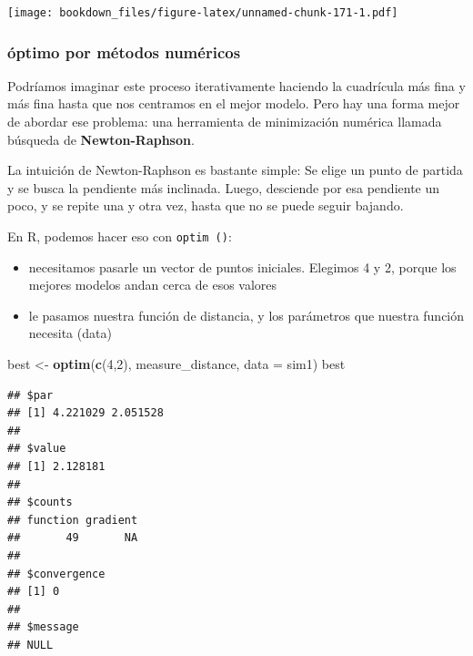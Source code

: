 \documentclass[]{book}
\newenvironment{Shaded}{\begin{snugshade}}{\end{snugshade}}
\newcommand{\DataTypeTok}[1]{\textcolor[rgb]{0.13,0.29,0.53}{#1}}
\newcommand{\DecValTok}[1]{\textcolor[rgb]{0.00,0.00,0.81}{#1}}
\newcommand{\KeywordTok}[1]{\textcolor[rgb]{0.13,0.29,0.53}{\textbf{#1}}}
\newcommand{\NormalTok}[1]{#1}
\newcommand{\OperatorTok}[1]{\textcolor[rgb]{0.81,0.36,0.00}{\textbf{#1}}}
\newcommand{\StringTok}[1]{\textcolor[rgb]{0.31,0.60,0.02}{#1}}
\providecommand{\tightlist}{%
  \setlength{\itemsep}{0pt}\setlength{\parskip}{0pt}}
\begin{document}
\texttt{[image: bookdown\_files/figure-latex/unnamed-chunk-171-1.pdf]}

\hypertarget{optimo-por-metodos-numericos}{%
\subsubsection{óptimo por métodos numéricos}\label{optimo-por-metodos-numericos}}

Podríamos imaginar este proceso iterativamente haciendo la cuadrícula más fina y más fina hasta que nos centramos en el mejor modelo. Pero hay una forma mejor de abordar ese problema: una herramienta de minimización numérica llamada búsqueda de \textbf{Newton-Raphson}.

La intuición de Newton-Raphson es bastante simple: Se elige un punto de partida y se busca la pendiente más inclinada. Luego, desciende por esa pendiente un poco, y se repite una y otra vez, hasta que no se puede seguir bajando.

En R, podemos hacer eso con \texttt{optim\ ()}:

\begin{itemize}
\tightlist
\item
  necesitamos pasarle un vector de puntos iniciales. Elegimos 4 y 2, porque los mejores modelos andan cerca de esos valores
\item
  le pasamos nuestra función de distancia, y los parámetros que nuestra función necesita (data)
\end{itemize}

\begin{Shaded}
\begin{Highlighting}[]
\NormalTok{best <-}\StringTok{ }\KeywordTok{optim}\NormalTok{(}\KeywordTok{c}\NormalTok{(}\DecValTok{4}\NormalTok{,}\DecValTok{2}\NormalTok{), measure_distance, }\DataTypeTok{data =}\NormalTok{ sim1)}
\NormalTok{best}
\end{Highlighting}
\end{Shaded}

\begin{verbatim}
## $par
## [1] 4.221029 2.051528
## 
## $value
## [1] 2.128181
## 
## $counts
## function gradient 
##       49       NA 
## 
## $convergence
## [1] 0
## 
## $message
## NULL
\end{verbatim}

\begin{Shaded}
\end{Shaded}
\end{document}

